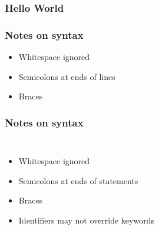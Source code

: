 \documentclass{beamer}
\begin{document}
\begin{frame}
    \frametitle{Hello World}
    \begin{figure}
        
    \end{figure}
\end{frame}

\begin{frame}
    \frametitle{Notes on syntax}
    \begin{itemize}
        \item Whitespace ignored
        \item Semicolons at ends of lines
        \item Braces
    \end{itemize}
\end{frame}

\begin{frame}
    \frametitle{Notes on syntax}
    \begin{columns}
        \begin{itemize}
            \item Whitespace ignored
            \item Semicolons at ends of statements
            \item Braces
            \item Identifiers may not override keywords
        \end{itemize}
        \begin{table}
            \texttt{%
            }
\end{table}
\end{columns}
\end{frame}
\end{document}
